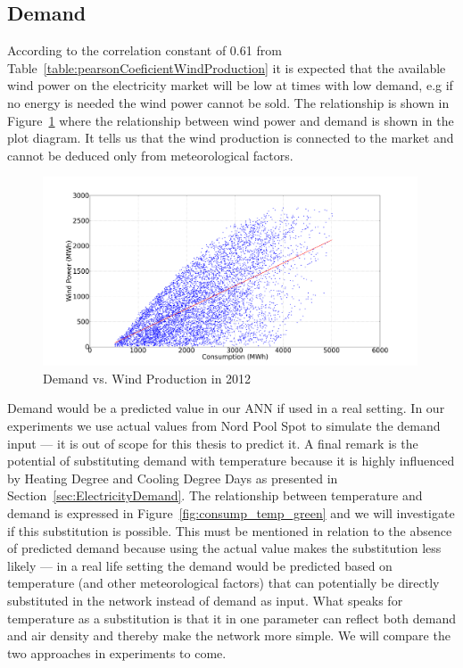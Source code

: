 \subsection{Demand}
\label{sec:demandWindProduction}
According to the correlation constant of 0.61 from Table~\ref{table:pearsonCoeficientWindProduction} it is expected that the available wind power on the electricity market will be low at times with low demand, e.g if no energy is needed the wind power cannot be sold.  The relationship is shown in Figure~\ref{fig:demandVsWindProduction} where the relationship between wind power and demand is shown in the plot diagram. It tells us that the wind production is connected to the market and cannot be deduced only from meteorological factors.

\begin{figure}[h!]
\centering
\includegraphics[width=0.99\textwidth]{billeder/consumptionVsWindProduction.png}
\caption{Demand vs. Wind Production in 2012}
\label{fig:demandVsWindProduction}
\end{figure}

\noindent Demand would be a predicted value in our ANN if used in a real setting. In our experiments we use actual values from Nord Pool Spot to simulate the demand input --- it is out of scope for this thesis to predict it. A final remark is the potential of substituting demand with temperature because it is highly influenced by Heating Degree and Cooling Degree Days as presented in Section~\ref{sec:ElectricityDemand}. The relationship between temperature and demand is expressed in Figure~\ref{fig:consump_temp_green} and we will investigate if this substitution is possible. This must be mentioned in relation to the absence of predicted demand because using the actual value makes the substitution less likely --- in a real life setting the demand would be predicted based on temperature (and other meteorological factors) that can potentially be directly substituted in the network instead of demand as input. What speaks for temperature as a substitution is that it in one parameter can reflect both demand and air density and thereby make the network more simple. We will compare the two approaches in experiments to come. 


